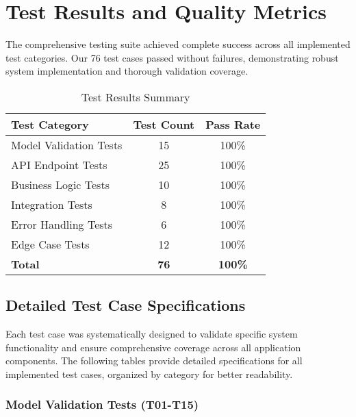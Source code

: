 \documentclass[12pt,a4paper]{article}
\begin{document}
\section{Test Results and Quality Metrics}

The comprehensive testing suite achieved complete success across all implemented test categories. Our 76 test cases passed without failures, demonstrating robust system implementation and thorough validation coverage.

\begin{table}[H]
\centering
\caption{Test Results Summary}
\begin{tabular}{@{}lcc@{}}
\toprule
\textbf{Test Category} & \textbf{Test Count} & \textbf{Pass Rate} \\
\midrule
Model Validation Tests & 15 & 100\% \\
API Endpoint Tests & 25 & 100\% \\
Business Logic Tests & 10 & 100\% \\
Integration Tests & 8 & 100\% \\
Error Handling Tests & 6 & 100\% \\
Edge Case Tests & 12 & 100\% \\
\midrule
\textbf{Total} & \textbf{76} & \textbf{100\%} \\
\bottomrule
\end{tabular}
\end{table}

\subsection{Detailed Test Case Specifications}

Each test case was systematically designed to validate specific system functionality and ensure comprehensive coverage across all application components. The following tables provide detailed specifications for all implemented test cases, organized by category for better readability.

\subsubsection{Model Validation Tests (T01-T15)}
\end{document}
